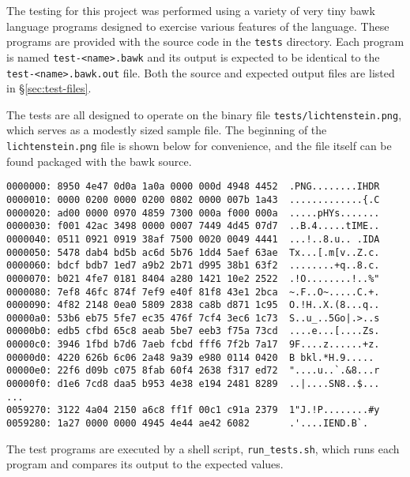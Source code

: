 The testing for this project was performed using a variety of very tiny bawk language programs designed to exercise various features of the language.  These programs are provided with the source code in the \texttt{tests} directory.  Each program is named \texttt{test-<name>.bawk} and its output is expected to be identical to the \texttt{test-<name>.bawk.out} file.  Both the source and expected output files are listed in \S\ref{sec:test-files}.

The tests are all designed to operate on the binary file \texttt{tests/lichtenstein.png}, which serves as a modestly sized sample file.  The beginning of the \texttt{lichtenstein.png} file is shown below for convenience, and the file itself can be found packaged with the bawk source.
\begin{verbatim}
0000000: 8950 4e47 0d0a 1a0a 0000 000d 4948 4452  .PNG........IHDR
0000010: 0000 0200 0000 0200 0802 0000 007b 1a43  .............{.C
0000020: ad00 0000 0970 4859 7300 000a f000 000a  .....pHYs.......
0000030: f001 42ac 3498 0000 0007 7449 4d45 07d7  ..B.4.....tIME..
0000040: 0511 0921 0919 38af 7500 0020 0049 4441  ...!..8.u.. .IDA
0000050: 5478 dab4 bd5b ac6d 5b76 1dd4 5aef 63ae  Tx...[.m[v..Z.c.
0000060: bdcf bdb7 1ed7 a9b2 2b71 d995 38b1 63f2  ........+q..8.c.
0000070: b021 4fe7 0181 8404 a280 1421 10e2 2522  .!O........!..%"
0000080: 7ef8 46fc 874f 7ef9 e40f 81f8 43e1 2bca  ~.F..O~.....C.+.
0000090: 4f82 2148 0ea0 5809 2838 ca8b d871 1c95  O.!H..X.(8...q..
00000a0: 53b6 eb75 5fe7 ec35 476f 7cf4 3ec6 1c73  S..u_..5Go|.>..s
00000b0: edb5 cfbd 65c8 aeab 5be7 eeb3 f75a 73cd  ....e...[....Zs.
00000c0: 3946 1fbd b7d6 7aeb fcbd fff6 7f2b 7a17  9F....z......+z.
00000d0: 4220 626b 6c06 2a48 9a39 e980 0114 0420  B bkl.*H.9..... 
00000e0: 22f6 d09b c075 8fab 60f4 2638 f317 ed72  "....u..`.&8...r
00000f0: d1e6 7cd8 daa5 b953 4e38 e194 2481 8289  ..|....SN8..$...
...
0059270: 3122 4a04 2150 a6c8 ff1f 00c1 c91a 2379  1"J.!P........#y
0059280: 1a27 0000 0000 4945 4e44 ae42 6082       .'....IEND.B`.
\end{verbatim}

The test programs are executed by a shell script, \texttt{run\_tests.sh}, which runs each program and compares its output to the expected values.
